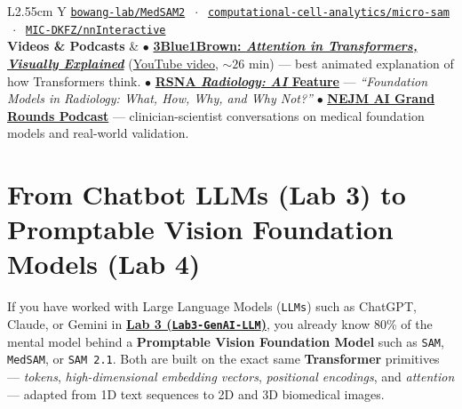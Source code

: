 \documentclass[10.5pt,a4paper]{article}
\begin{document}
\begin{table}[H]
\begin{tabularx}{\textwidth}{L{2.55cm} Y}
\href{https://github.com/bowang-lab/MedSAM2}{\texttt{bowang-lab/MedSAM2}} $\;\cdot\;$
\href{https://github.com/computational-cell-analytics/micro-sam}{\texttt{computational-cell-analytics/micro-sam}} $\;\cdot\;$
\href{https://github.com/MIC-DKFZ/nnInteractive}{\texttt{MIC-DKFZ/nnInteractive}} \\
\textbf{Videos \& Podcasts} &
$\bullet$ \href{https://www.3blue1brown.com/lessons/attention}{\textbf{3Blue1Brown: \emph{Attention in Transformers, Visually Explained}}} (\href{https://www.youtube.com/watch?v=eMlx5fFNoYc}{YouTube video}, $\sim 26\text{ min}$) --- best animated explanation of how Transformers think. \newline
$\bullet$ \href{https://www.youtube.com/watch?v=1d3L0g0GzEE}{\textbf{RSNA \emph{Radiology: AI} Feature}} --- \emph{``Foundation Models in Radiology: What, How, Why, and Why Not?''} \newline
$\bullet$ \href{https://ai-podcast.nejm.org/}{\textbf{NEJM AI Grand Rounds Podcast}} --- clinician-scientist conversations on medical foundation models and real-world validation. \\
\bottomrule
\end{tabularx}
\caption{Curated non-technical readings, interactive demos, code repositories, videos, and podcasts to pair with this guide.}
\label{tab:nontech-sam-resources}
\end{table}

\newpage
\section{From Chatbot LLMs (Lab 3) to Promptable Vision Foundation Models (Lab 4)}

If you have worked with Large Language Models (\texttt{LLMs}) such as ChatGPT, Claude, or Gemini in \href{https://github.com/arvidl/BMED365-2027/tree/main/Lab3-GenAI-LLM}{\textbf{Lab 3 (\texttt{Lab3-GenAI-LLM})}}, you already know 80\% of the mental model behind a \textbf{Promptable Vision Foundation Model} such as \texttt{SAM}, \texttt{MedSAM}, or \texttt{SAM 2.1}. Both are built on the exact same \textbf{Transformer} primitives --- \emph{tokens}, \emph{high-dimensional embedding vectors}, \emph{positional encodings}, and \emph{attention} --- adapted from 1D text sequences to 2D and 3D biomedical images.
\end{document}
